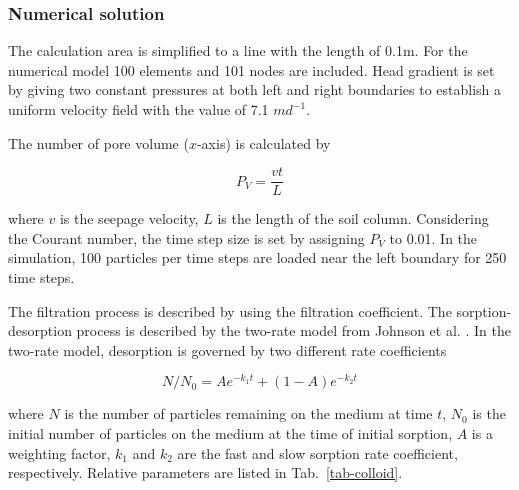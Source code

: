 \subsubsection{Numerical solution}

The calculation area is simplified to a line with the length of 0.1m. For the numerical model 100 elements and 101 nodes are included. Head gradient is set by giving two constant pressures at both left and right boundaries to establish a uniform velocity field with the value of 7.1 $md^{-1}$. 

The number of pore volume ($x$-axis) is calculated by

\begin{equation}\label{colloid pv}
P_{V} = \frac{v t}{L}
\end{equation}

where $v$ is the seepage velocity, $L$ is the length of the soil column. Considering the Courant number, the time step size is set by assigning $P_{V}$ to 0.01. In the simulation, 100 particles per time steps are loaded near the left boundary for 250 time steps.

The filtration process is described by using the filtration coefficient. The sorption-desorption process is described by the two-rate model from Johnson et al. \cite{JohBluLog:95}. In the two-rate model, desorption is governed by two different rate coefficients

\begin{equation}\label{colloid two-rate}
N/N_{0} = A e^{-k_{1}t} + (1-A) e^{-k_{2}t}
\end{equation}

where $N$ is the number of particles remaining on the medium at time $t$, $N_{0}$ is the initial number of particles on the medium at the time of initial sorption, $A$ is a weighting factor, $k_{1}$ and $k_{2}$ are the fast and slow sorption rate coefficient, respectively. Relative parameters are listed in Tab.~\ref{tab-colloid}.

